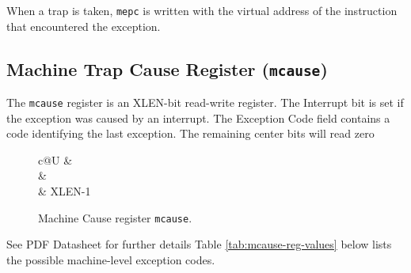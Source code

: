 \fi

When a trap is taken, \texttt{mepc} is written with the virtual address of the
instruction that encountered the exception.

\subsection{Machine Trap Cause Register
(\texttt{mcause})}\label{machine-trap-cause-register-mcause}

The \texttt{mcause} register is an XLEN-bit read-write register. The Interrupt
bit is set if the exception was caused by an interrupt. The Exception
Code field contains a code identifying the last exception. The remaining
center bits will read zero

\ifdefined\MARKDOWN
\else
\begin{figure*}[!ht]
	{\footnotesize
		\begin{center}
			\begin{tabular}{c@{}U}
				 &
				 \\
				\hline
				 &
				 \\
				 & XLEN-1 \\
			\end{tabular}
		\end{center}
	}
	\vspace{-0.1in}
	\caption{Machine Cause register \texttt{mcause}.}
	\label{fig:mcausereg}
\end{figure*}
\fi

\ifdefined\MARKDOWN
See PDF Datasheet for further details
\else
Table \ref{tab:mcause-reg-values} below lists the possible machine-level exception codes.


